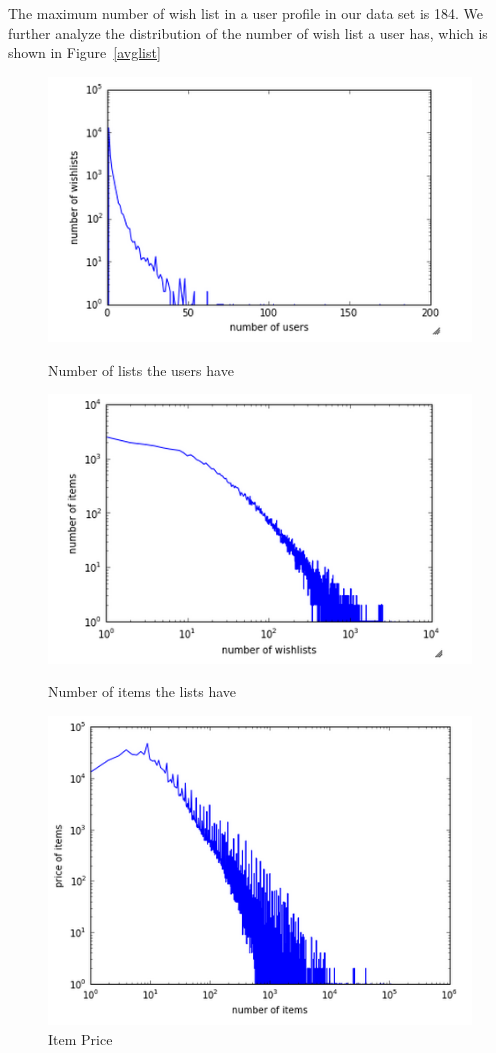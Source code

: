 \documentclass{llncs}
\begin{document}
The maximum number of wish list in a user profile in our data set is 184. We further analyze the distribution of the number of wish list a user has, which is shown in Figure~\ref{avglist}

\begin{figure}[H]
  \includegraphics[width=\linewidth]{avglist.png}
  \caption{Number of lists the users have}
  \label{avglist}
\endminipage\hfill
{}%
  \includegraphics[width=\linewidth]{avgitem.png}
  \caption{Number of items the lists have}
  \label{avgitem}
\endminipage\hfill
{}%
  \includegraphics[width=\linewidth]{avgprice.png}
  \caption{Item Price}
  \label{avgprice}
\endminipage
\end{figure}
\end{document}
